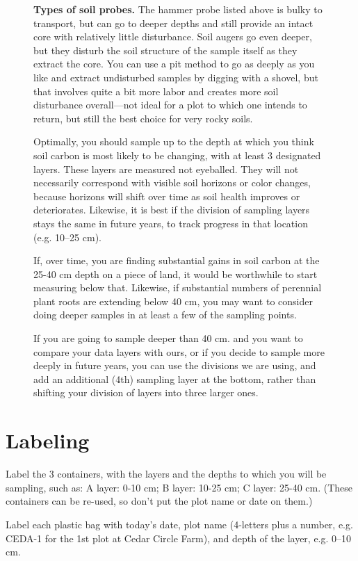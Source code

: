 \documentclass[11pt,letterpaper,twoside,onecolumn]{memoir}
\begin{document}
\begin{figure}
\begin{tcolorbox}
\setlength{\parskip}{.7em}
\textbf{Types of soil probes.} The hammer probe listed above is bulky to transport, but can go to deeper depths and still provide an intact core with relatively little disturbance. Soil augers go even deeper, but they disturb the soil structure of the sample itself as they extract the core.  You can use a pit method to go as deeply as you like and extract undisturbed samples by digging with a shovel, but that involves quite a bit more labor and creates more soil disturbance overall---not ideal for a plot to which one intends to return, but still the best choice for very rocky soils.  

Optimally, you should sample up to the depth at which you think soil carbon is most likely to be changing, with at least 3 designated layers.  These layers are measured not eyeballed. They will not necessarily correspond with visible soil horizons or color changes, because horizons will shift over time as soil health improves or deteriorates. Likewise, it is best if the division of sampling layers stays the same in future years, to track progress in that location (e.g. 10--25 cm). 

If, over time, you are finding substantial gains in soil carbon at the 25-40 cm depth on a piece of land, it would be worthwhile to start measuring below that.  Likewise, if substantial numbers of perennial plant roots are extending below 40 cm, you may want to consider doing deeper samples in at least a few of the sampling points.

If you are going to sample deeper than 40 cm. and you want to compare your data layers with ours, or if you decide to sample more deeply in future years, you can use the divisions we are using, and add an additional (4th) sampling layer at the bottom, rather than shifting your division of layers into three larger ones. 
\end{tcolorbox}
\end{figure}

\section*{Labeling}
Label the 3 containers, with the layers and the depths to which you will be sampling, such as: A layer: 0-10 cm; B layer: 10-25 cm; C layer: 25-40 cm. (These containers can be re-used, so don't put the plot name or date on them.)

Label each plastic bag with today's date, plot name (4-letters plus a number, e.g. CEDA-1 for the 1st plot at Cedar Circle Farm), and depth of the layer, e.g. 0--10 cm.
\end{document}
